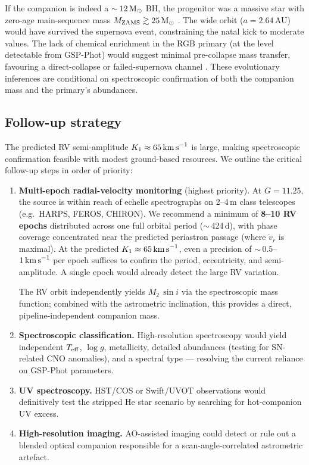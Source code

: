 \documentclass[usenatbib,fleqn]{mnras}
\newcommand{\Msun}{{\rm M}_\odot}
\newcommand{\kms}{{\rm km\,s}^{-1}}
\begin{document}
If the companion is indeed a $\sim$\,$12\,\Msun$ BH, the
progenitor was a massive star with zero-age main-sequence
mass $M_{\rm ZAMS} \gtrsim 25\,\Msun$ \citep{Fryer2012}.
The wide orbit ($a = 2.64$\,AU) would have survived the
supernova event, constraining the natal kick to moderate
values.  The lack of chemical enrichment in the RGB primary
(at the level detectable from GSP-Phot) would suggest minimal
pre-collapse mass transfer, favouring a direct-collapse or
failed-supernova channel \citep{Langer2020}.
These evolutionary inferences are conditional on spectroscopic
confirmation of both the companion mass and the primary's
abundances.

\subsection{Follow-up strategy}
\label{sec:followup}

The predicted RV semi-amplitude $K_1 \approx 65\,\kms$ is
large, making spectroscopic confirmation feasible with modest
ground-based resources.  We outline the critical follow-up
steps in order of priority:

\begin{enumerate}
\item \textbf{Multi-epoch radial-velocity monitoring}
  (highest priority).  At $G = 11.25$, the source is within reach
  of echelle spectrographs on 2--4\,m class telescopes
  (e.g.\ HARPS, FEROS, CHIRON).  We recommend a minimum of
  \textbf{8--10 RV epochs} distributed across one full orbital
  period ($\sim$\,424\,d), with phase coverage concentrated near
  the predicted periastron passage (where $\dot{v}_r$ is maximal).
  At the predicted $K_1 \approx 65\,\kms$, even a precision of
  $\sim$\,$0.5$--$1\,\kms$ per epoch suffices to confirm the
  period, eccentricity, and semi-amplitude.  A single epoch
  would already detect the large RV variation.

  The RV orbit independently yields $M_2\,\sin i$ via the
  spectroscopic mass function; combined with the astrometric
  inclination, this provides a direct, pipeline-independent
  companion mass.

\item \textbf{Spectroscopic classification.}  High-resolution
  spectroscopy would yield independent $T_{\rm eff}$, $\log g$,
  metallicity, detailed abundances (testing for SN-related CNO
  anomalies), and a spectral type --- resolving the current
  reliance on GSP-Phot parameters.

\item \textbf{UV spectroscopy.}  HST/COS or Swift/UVOT
  observations would definitively test the stripped He star
  scenario by searching for hot-companion UV excess.

\item \textbf{High-resolution imaging.}  AO-assisted imaging
  could detect or rule out a blended optical companion responsible
  for a scan-angle-correlated astrometric artefact.
\end{enumerate}
\end{document}

